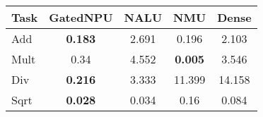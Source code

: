 \begin{tabular}{lcccc}
\toprule
Task & GatedNPU & NALU & NMU & Dense\\
\midrule
Add  & \textbf{0.183} & 2.691 & 0.196 & 2.103 \\
Mult & 0.34 & 4.552 & \textbf{0.005} & 3.546 \\
Div  & \textbf{0.216} & 3.333 & 11.399 & 14.158 \\
Sqrt & \textbf{0.028} & 0.034 & 0.16 & 0.084 \\
\bottomrule
\end{tabular}
